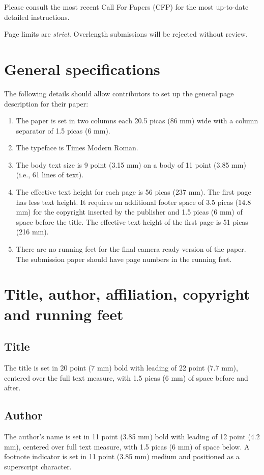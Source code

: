 \documentclass{ecai}
\begin{document}
Please consult the most recent Call For Papers (CFP) for the most up-to-date
detailed instructions.

Page limits are \textit{strict}. Overlength submissions will be rejected without review.

\section{General specifications}
The following details should allow contributors to set up the general
page description for their paper:

\begin{enumerate}
\item The paper is set in two columns each 20.5 picas (86 mm) wide
  with a column separator of 1.5 picas (6 mm).

\item The typeface is Times Modern Roman.

\item The body text size is 9 point (3.15 mm) on a body of 11
point (3.85 mm) (i.e., 61 lines of text).

\item The effective text height for each page is 56 picas (237 mm).
The first page has less text height. It requires an additional footer
space of 3.5 picas (14.8 mm) for the copyright inserted by the publisher
and 1.5 picas (6 mm) of space before the title.
The effective text height of the first page is 51 picas (216 mm).

\item There are no running feet for the final camera-ready version of the
paper. The submission paper should have page numbers in the running feet.

\end {enumerate}

\section{Title, author, affiliation, copyright
and running feet}
\subsection{Title}
The title is set in 20 point (7 mm) bold with leading of 22 point (7.7
mm), centered over the full text measure, with 1.5 picas (6 mm) of
space before and after.

\subsection{Author}
The author's name is set in 11 point (3.85 mm) bold with leading of 12
point (4.2 mm), centered over full text measure, with 1.5 picas (6 mm)
of space below. A footnote indicator is set in 11 point (3.85 mm)
medium and positioned as a superscript character.
\end{document}
